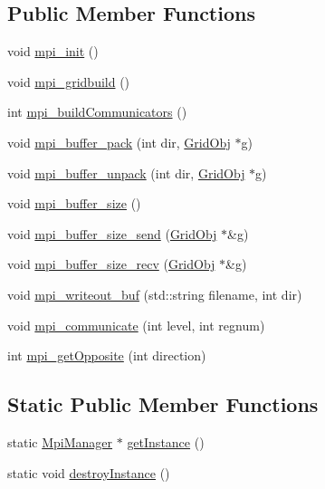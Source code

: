 \subsection*{Public Member Functions}
\begin{DoxyCompactItemize}
\item 
void \hyperlink{class_mpi_manager_a02adaa06e139dfca2bc71e1a1dbf25c7}{mpi\+\_\+init} ()
\item 
void \hyperlink{class_mpi_manager_a7f07e85131147b55eec643c791ec2ba0}{mpi\+\_\+gridbuild} ()
\item 
int \hyperlink{class_mpi_manager_a749fa958cb7343183a69ca6191b45286}{mpi\+\_\+build\+Communicators} ()
\item 
void \hyperlink{class_mpi_manager_ae1b33a4a24d9abf528528a296aa1d92d}{mpi\+\_\+buffer\+\_\+pack} (int dir, \hyperlink{class_grid_obj}{Grid\+Obj} $\ast$g)
\item 
void \hyperlink{class_mpi_manager_abf5e0511918b4ae6ec524d737618e341}{mpi\+\_\+buffer\+\_\+unpack} (int dir, \hyperlink{class_grid_obj}{Grid\+Obj} $\ast$g)
\item 
void \hyperlink{class_mpi_manager_a1bf713399e26a5ffbc03147e0a20c585}{mpi\+\_\+buffer\+\_\+size} ()
\item 
void \hyperlink{class_mpi_manager_af26d2a0a2430f7c1b5def5f954a10f1d}{mpi\+\_\+buffer\+\_\+size\+\_\+send} (\hyperlink{class_grid_obj}{Grid\+Obj} $\ast$\&g)
\item 
void \hyperlink{class_mpi_manager_afa7547c05583bf6c52ea48cc1dc13336}{mpi\+\_\+buffer\+\_\+size\+\_\+recv} (\hyperlink{class_grid_obj}{Grid\+Obj} $\ast$\&g)
\item 
void \hyperlink{class_mpi_manager_ab498bdf0822e2747f83c187d682dd934}{mpi\+\_\+writeout\+\_\+buf} (std\+::string filename, int dir)
\item 
void \hyperlink{class_mpi_manager_aedcf84c06fc3e0486fac61d09ce0a268}{mpi\+\_\+communicate} (int level, int regnum)
\item 
int \hyperlink{class_mpi_manager_a3c10ab477c2e4387d6a02104f9b2a2ea}{mpi\+\_\+get\+Opposite} (int direction)
\end{DoxyCompactItemize}
\subsection*{Static Public Member Functions}
\begin{DoxyCompactItemize}
\item 
static \hyperlink{class_mpi_manager}{Mpi\+Manager} $\ast$ \hyperlink{class_mpi_manager_a486e424ae1b9dfa3218d260b0f9a0a2f}{get\+Instance} ()
\item 
static void \hyperlink{class_mpi_manager_a03b7914615ccb6e7b8a285f50860d503}{destroy\+Instance} ()
\end{DoxyCompactItemize}
